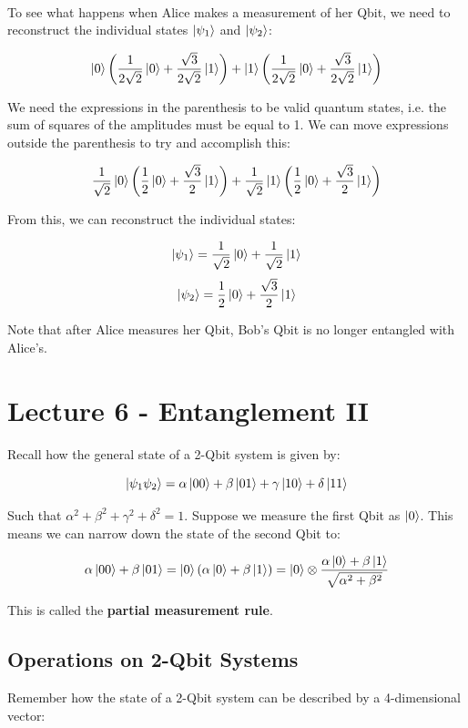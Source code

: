 \documentclass[12pt]{article}
\begin{document}
\noindent
\\
To see what happens when Alice makes a measurement of her Qbit, we need to reconstruct the individual states $\ket{\psi_1}$ and $\ket{\psi_2}$:

\[ \ket{0} \left( \frac{1}{2\sqrt{2}}\ket{0} + \frac{\sqrt{3}}{2\sqrt{2}}\ket{1} \right) + \ket{1} \left( \frac{1}{2\sqrt{2}}\ket{0} + \frac{\sqrt{3}}{2\sqrt{2}}\ket{1} \right) \]

\noindent
We need the expressions in the parenthesis to be valid quantum states, i.e. the sum of squares of the amplitudes must be equal to 1.
We can move expressions outside the parenthesis to try and accomplish this:

\[ \frac{1}{\sqrt{2}}\ket{0} \left( \frac{1}{2}\ket{0} + \frac{\sqrt{3}}{2}\ket{1} \right) + \frac{1}{\sqrt{2}}\ket{1} \left( \frac{1}{2}\ket{0} + \frac{\sqrt{3}}{2}\ket{1} \right) \]

\noindent
From this, we can reconstruct the individual states:

\[ \ket{\psi_1} = \frac{1}{\sqrt{2}}\ket{0} + \frac{1}{\sqrt{2}}\ket{1} \]
\[ \ket{\psi_2} = \frac{1}{2}\ket{0} + \frac{\sqrt{3}}{2}\ket{1} \]

\noindent
Note that after Alice measures her Qbit, Bob's Qbit is no longer entangled with Alice's.

%
%
\section*{Lecture 6 - Entanglement II}
Recall how the general state of a 2-Qbit system is given by:

\[ \ket{\psi_1\psi_2} = \alpha \ket{00} + \beta \ket{01} + \gamma \ket{10} + \delta \ket{11} \]

\noindent
Such that $\alpha^2 + \beta^2 + \gamma^2 + \delta^2 = 1$.
Suppose we measure the first Qbit as $\ket{0}$.
This means we can narrow down the state of the second Qbit to:

\[ \alpha \ket{00} + \beta \ket{01} = \ket{0}\left( \alpha \ket{0} + \beta \ket{1} \right) = \ket{0} \otimes \frac{\alpha \ket{0} + \beta \ket{1}}{\sqrt{\alpha^2 + \beta^2}} \]

\noindent
This is called the \textbf{partial measurement rule}.

\newpage
\subsection*{Operations on 2-Qbit Systems}
Remember how the state of a 2-Qbit system can be described by a 4-dimensional vector:
\end{document}
